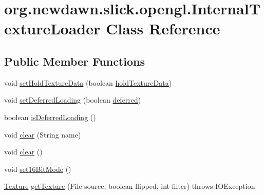 \hypertarget{classorg_1_1newdawn_1_1slick_1_1opengl_1_1_internal_texture_loader}{}\section{org.\+newdawn.\+slick.\+opengl.\+Internal\+Texture\+Loader Class Reference}
\label{classorg_1_1newdawn_1_1slick_1_1opengl_1_1_internal_texture_loader}
\subsection*{Public Member Functions}
\begin{DoxyCompactItemize}
\item 
void \mbox{\hyperlink{classorg_1_1newdawn_1_1slick_1_1opengl_1_1_internal_texture_loader_aad0662c212972f36d5b0fd252934deaf}{set\+Hold\+Texture\+Data}} (boolean \mbox{\hyperlink{classorg_1_1newdawn_1_1slick_1_1opengl_1_1_internal_texture_loader_a45b8c17af18ad5095972b3f519eb17bd}{hold\+Texture\+Data}})
\item 
void \mbox{\hyperlink{classorg_1_1newdawn_1_1slick_1_1opengl_1_1_internal_texture_loader_a85712ee47210f31f5605e04dba77b5ab}{set\+Deferred\+Loading}} (boolean \mbox{\hyperlink{classorg_1_1newdawn_1_1slick_1_1opengl_1_1_internal_texture_loader_afde58d084fb7c587c15b674005617ff4}{deferred}})
\item 
boolean \mbox{\hyperlink{classorg_1_1newdawn_1_1slick_1_1opengl_1_1_internal_texture_loader_a0b944a7578a266f2ffae2b4259497823}{is\+Deferred\+Loading}} ()
\item 
void \mbox{\hyperlink{classorg_1_1newdawn_1_1slick_1_1opengl_1_1_internal_texture_loader_a80bb3806e16e4126079325b16621ed78}{clear}} (String name)
\item 
void \mbox{\hyperlink{classorg_1_1newdawn_1_1slick_1_1opengl_1_1_internal_texture_loader_ae362e4e3381e0c824ebf6538029c14e1}{clear}} ()
\item 
void \mbox{\hyperlink{classorg_1_1newdawn_1_1slick_1_1opengl_1_1_internal_texture_loader_a437129416e05ec67f039b06f2c3159af}{set16\+Bit\+Mode}} ()
\item 
\mbox{\hyperlink{interfaceorg_1_1newdawn_1_1slick_1_1opengl_1_1_texture}{Texture}} \mbox{\hyperlink{classorg_1_1newdawn_1_1slick_1_1opengl_1_1_internal_texture_loader_a5d76355a0aa7c2b3d7dd6106412d5805}{get\+Texture}} (File source, boolean flipped, int filter)  throws I\+O\+Exception 
\item 

\end{DoxyCompactItemize}
